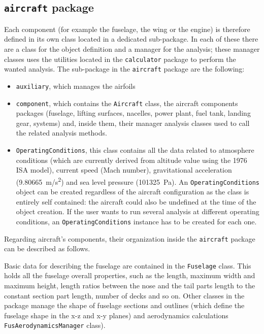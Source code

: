 \subsection{\texttt{aircraft} package}
Each component (for example the fuselage, the wing or the engine) is therefore defined in its own class located in a dedicated sub-package. In each of these there are a class for the object definition and a manager for the analysis; these manager classes uses the utilities located in the \lstinline[language=Java]!calculator! package to perform the wanted analysis.
%
The sub-package in the \lstinline[language=Java]!aircraft! package are the following:
%
\begin{itemize}
\item \lstinline[language=Java]!auxiliary!, which manages the airfoils
\item \lstinline[language=Java]!component!, which contains the \lstinline[language=Java]!Aircraft! class, the aircraft components packages (fuselage, lifting surfaces, nacelles, power plant, fuel tank, landing gear, systems) and, inside them, their manager analysis classes used to call the related analysis methods. 
\item \lstinline[language=Java]!OperatingConditions!, this class contains all the data related to atmosphere conditions (which are currently derived from altitude value using the 1976 ISA model), current speed (Mach number), gravitational acceleration (\SI{9.80665 }{\meter/\second^2}) and sea level pressure (\SI{101325}{\Pa}). An \lstinline[language=Java]!OperatingConditions! object can be created regardless of the aircraft configuration as the class is entirely self contained: the aircraft could also be undefined at the time of the object creation. If the user wants to run several analysis at different operating conditions, an \lstinline[language=Java]!OperatingConditions! instance has to be created for each one.
\end{itemize}
%
\noindent
Regarding aircraft's components, their organization inside the \lstinline[language=Java]!aircraft! package can be described as follows. 

\bigskip
\noindent
Basic data for describing the fuselage are contained in the \lstinline[language=Java]!Fuselage! class. This holds all the fuselage overall properties, such as the length, maximum width and maximum height, length ratios between the nose and the tail parts length to the constant section part length, number of decks and so on. Other classes in the package manage the shape of fuselage sections and outlines (which define the fuselage shape in the x-z and x-y planes) and aerodynamics calculations \lstinline[language=Java]!FusAerodynamicsManager! class).

